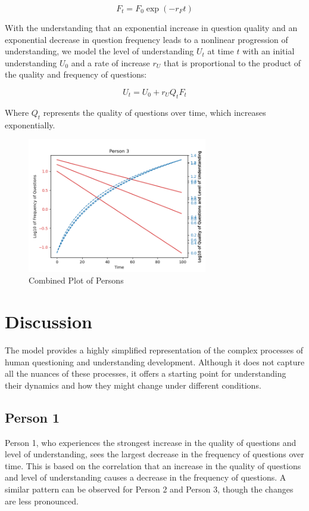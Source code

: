 \documentclass{article}
\begin{document}
\[
F_t = F_0 \exp(-r_F t)
\]

With the understanding that an exponential increase in question quality and an exponential decrease in question frequency leads to a nonlinear progression of understanding, we model the level of understanding $U_t$ at time $t$ with an initial understanding $U_0$ and a rate of increase $r_U$ that is proportional to the product of the quality and frequency of questions:

\[
U_t = U_0 + r_U Q_t F_t
\]

Where $Q_t$ represents the quality of questions over time, which increases exponentially.

\begin{figure}[ht]
\centering
\includegraphics[width=0.7\textwidth]{combined_plot.png}
\caption{Combined Plot of Persons}
\label{fig:combinedplot}
\end{figure}

\section{Discussion}

The model provides a highly simplified representation of the complex processes of human questioning and understanding development. Although it does not capture all the nuances of these processes, it offers a starting point for understanding their dynamics and how they might change under different conditions.

\subsection{Person 1}

Person 1, who experiences the strongest increase in the quality of questions and level of understanding, sees the largest decrease in the frequency of questions over time. This is based on the correlation that an increase in the quality of questions and level of understanding causes a decrease in the frequency of questions. A similar pattern can be observed for Person 2 and Person 3, though the changes are less pronounced.
\end{document}
